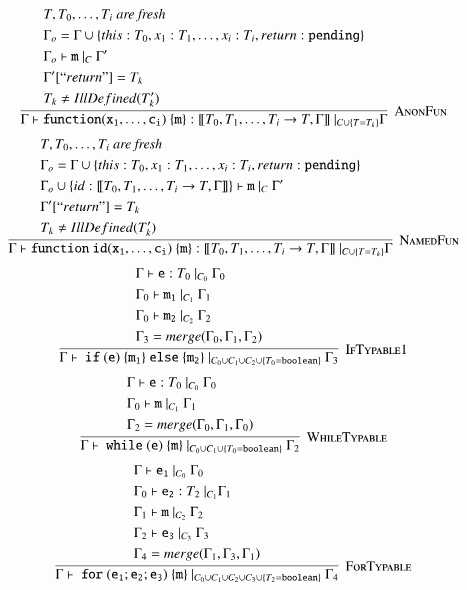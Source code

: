 \documentclass[12pt,a4paper,twoside,openright]{report}
\theoremstyle{definition}
\theoremstyle{dotless}
\begin{document}
$$\infer[\textsc{AnonFun}]{
  \Gamma\vdash\mathtt{function(x_1, \dots, c_i)\ \{m\}}:[\![T_0, T_1, \dots, T_i\rightarrow T, \Gamma]\!]\ |_{C\cup \{T=T_k\}} \Gamma
}{
  \begin{split}
	&T, T_0, \dots, T_i\textit{ are fresh} \\
  	&\Gamma_o = \Gamma\cup\{this:T_0, x_1:T_1, \dots, x_i:T_i, return: \mathtt{pending}\} \\ 
  	&\Gamma_o \vdash \mathtt{m}\ |_C\ \Gamma'\\
  	&\Gamma'[``return"] = T_k \\
	&T_k \neq IllDefined(T_k')
  \end{split}
}$$
$$\infer[\textsc{NamedFun}]{
  \Gamma\vdash\mathtt{function\ id(x_1, \dots, c_i)\ \{m\}}:[\![T_0, T_1, \dots, T_i\rightarrow T, \Gamma]\!]\ |_{C\cup \{T=T_k\}} \Gamma
}{
  \begin{split}
	&T, T_0, \dots, T_i\textit{ are fresh} \\
  	&\Gamma_o = \Gamma\cup\{this:T_0, x_1:T_1, \dots, x_i:T_i, return: \mathtt{pending}\} \\ 
	& \Gamma_o\cup \{ id: [\![T_0, T_1, \dots, T_i\rightarrow T, \Gamma]\!]\} \vdash \mathtt{m}\ |_C\ \Gamma'\\
  	&\Gamma'[``return"] = T_k \\
	&T_k \neq IllDefined(T_k')
  \end{split}
}$$
$$\infer[\textsc{IfTypable1}]{
  \Gamma\vdash\ \mathtt{if\ (e)\ \{m_1\}\ else\ \{m_2\}}\ |_{C_0\cup C_1\cup C_2\cup\{T_0=\mathtt{boolean}\}}\ \Gamma_3
}{
  \begin{split}
	&\Gamma\vdash \mathtt{e}:T_0\ |_{C_0}\ \Gamma_0 \\
	&\Gamma_0\vdash \mathtt{m_1}\ |_{C_1}\ \Gamma_1 \\
	&\Gamma_0\vdash \mathtt{m_2}\ |_{C_2}\ \Gamma_2 \\
	&\Gamma_3 = merge(\Gamma_0, \Gamma_1, \Gamma_2)
  \end{split}
}$$
$$\infer[\textsc{WhileTypable}]{
  \Gamma\vdash\ \mathtt{while\ (e)\ \{m\}}\ |_{C_0\cup C_1\cup \{T_0=\mathtt{boolean}\}}\ \Gamma_2
}{
  \begin{split}
	&\Gamma\vdash \mathtt{e}:T_0\ |_{C_0}\ \Gamma_0 \\
	&\Gamma_0\vdash \mathtt{m}\ |_{C_1}\ \Gamma_1 \\
	&\Gamma_2 = merge(\Gamma_0, \Gamma_1, \Gamma_0)
  \end{split}
}$$
$$\infer[\textsc{ForTypable}]{
  \Gamma\vdash\ \mathtt{for\ (e_1; e_2; e_3)\ \{m\}}\ |_{C_0\cup C_1\cup C_2\cup C_3\cup \{T_2=\mathtt{boolean}\}}\ \Gamma_4
}{
  \begin{split}
	&\Gamma\vdash \mathtt{e_1}\ |_{C_0}\ \Gamma_0 \\
	&\Gamma_0\vdash \mathtt{e_2} : T_2\ |_{C_1} \Gamma_1 \\
	&\Gamma_1\vdash \mathtt{m}\ |_{C_2}\ \Gamma_2 \\
	&\Gamma_2\vdash \mathtt{e_3}\ |_{C_3}\ \Gamma_3 \\
	&\Gamma_4 = merge(\Gamma_1, \Gamma_3, \Gamma_1)
  \end{split}
}$$
\end{document}
